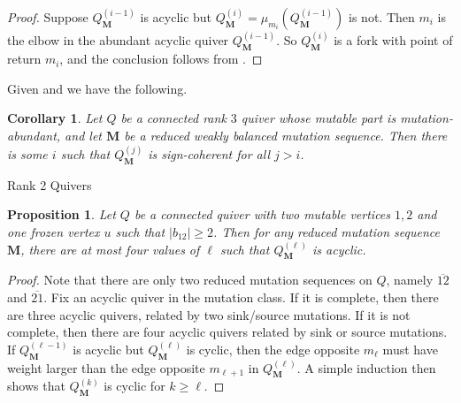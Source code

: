\documentclass[12pt]{amsart}
\makeatletter
\newtheorem{cor}[thm]{Corollary}
\newtheorem{prop}[thm]{Proposition}
\theoremstyle{definition}
\theoremstyle{remark}
\numberwithin{equation}{section}
\def\subsection{\@startsection{subsection}{3}%
  \z@{.5\linespacing\@plus.7\linespacing}{.1\linespacing}%
  {\bfseries}}
\makeatother
\begin{document}
\begin{proof}
Suppose $Q^{(i-1)}_{\mathbf M}$ is acyclic but $Q^{(i)}_{\mathbf M} = \mu_{m_i}(Q^{(i-1)}_{\mathbf M})$ is not.
Then $m_i$ is the elbow in the abundant acyclic quiver $Q^{(i-1)}_{\mathbf M}$. 
So $Q^{(i)}_{\mathbf M}$ is a fork with point of return $m_i$, and the conclusion follows from .
\end{proof}

Given  and  we have the following.

\begin{cor}
\label{cor: rank 3 sign coherent}
Let $Q$ be a connected rank $3$ quiver whose mutable part is mutation-abundant, and let $\mathbf M$ be a reduced weakly balanced mutation sequence.
Then there is some $i$ such that $Q^{(j)}_{\mathbf M}$ is sign-coherent for all $j > i$.
\end{cor}

\subsection{Rank 2 Quivers}

\begin{prop}\label{prop: rank 2 acyclic}
Let $Q$ be a connected quiver with two mutable vertices $1,2$ and one frozen vertex $u$ such that $|b_{12}| \geq 2$. Then for any reduced mutation sequence $\mathbf M$, there are at most four values of $\ell$ such that $Q^{(\ell)}_{\mathbf M}$ is acyclic. 
\end{prop}
\begin{proof}
Note that there are only two reduced mutation sequences on $Q$, namely $\overline{12}$ and $\overline{21}$. 
Fix an acyclic quiver in the mutation class. 
If it is complete, then there are three acyclic quivers, related by two sink/source mutations.  
If it is not complete, then there are four acyclic quivers related by sink or source mutations.
If $Q_\mathbf{M}^{(\ell-1)}$ is acyclic but $Q_\mathbf{M}^{(\ell)}$ is cyclic, then the edge opposite $m_\ell$ must have weight larger than the edge opposite $m_{\ell + 1}$ in $Q_\mathbf{M}^{(\ell)}$.  A simple induction then shows that $Q_\mathbf{M}^{(k)}$ is cyclic for $k \geq \ell$. 
\end{proof}
\end{document}
